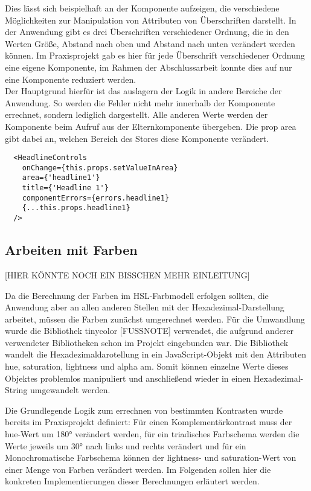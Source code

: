 Dies lässt sich beispielhaft an der Komponente aufzeigen, die verschiedene Möglichkeiten zur Manipulation von Attributen von Überschriften darstellt. In der Anwendung gibt es drei Überschriften verschiedener Ordnung, die in den Werten Größe,  Abstand nach oben und Abstand  nach unten verändert werden können. Im Praxisprojekt gab es hier für jede Überschrift verschiedener Ordnung eine eigene Komponente, im Rahmen der Abschlussarbeit konnte dies auf nur eine Komponente reduziert werden.\\
Der Hauptgrund hierfür ist das auslagern der Logik in andere Bereiche der Anwendung. So werden die Fehler nicht mehr innerhalb der Komponente errechnet, sondern lediglich dargestellt. Alle anderen Werte werden der Komponente beim Aufruf aus der Elternkomponente übergeben. Die prop area gibt dabei an, welchen Bereich des Stores diese Komponente verändert.

\begin{lstlisting}
  <HeadlineControls
  	onChange={this.props.setValueInArea}
  	area={'headline1'}
  	title={'Headline 1'}
  	componentErrors={errors.headline1}
  	{...this.props.headline1}
  />
\end{lstlisting}

\subsection{Arbeiten mit Farben}
[HIER KÖNNTE NOCH EIN BISSCHEN MEHR EINLEITUNG]

Da die Berechnung der Farben im HSL-Farbmodell erfolgen sollten, die Anwendung aber an allen anderen Stellen mit der Hexadezimal-Darstellung arbeitet, müssen die Farben zunächst umgerechnet werden. Für die Umwandlung wurde die Bibliothek tinycolor [FUSSNOTE] verwendet, die aufgrund anderer verwendeter Bibliotheken schon im Projekt eingebunden war.
Die Bibliothek wandelt die Hexadezimaldarotellung in ein JavaScript-Objekt mit den Attributen hue, saturation, lightness und alpha am. Somit können einzelne Werte dieses Objektes problemlos manipuliert und anschließend wieder in einen Hexadezimal-String umgewandelt werden.

Die Grundlegende Logik zum errechnen von bestimmten Kontrasten wurde bereits im Praxisprojekt definiert: Für einen Komplementärkontrast muss der hue-Wert um 180° verändert werden, für ein triadisches Farbschema werden die Werte jeweils um 30° nach links und rechts verändert und für ein Monochromatische Farbschema können der lightness- und saturation-Wert von einer Menge von Farben verändert werden.
Im Folgenden sollen hier die konkreten Implementierungen dieser Berechnungen erläutert werden.

